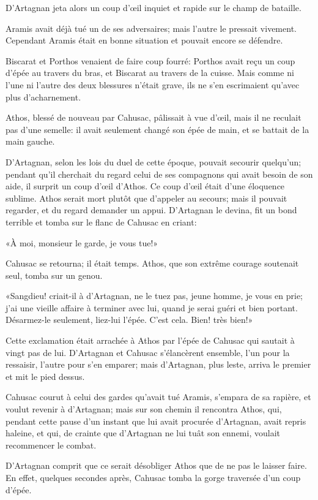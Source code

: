 D'Artagnan jeta alors un coup d'œil inquiet et rapide sur le champ de bataille. 

Aramis avait déjà tué un de ses adversaires; mais l'autre le pressait vivement. Cependant Aramis était en bonne situation et pouvait encore se défendre. 

Biscarat et Porthos venaient de faire coup fourré: Porthos avait reçu un coup d'épée au travers du bras, et Biscarat au travers de la cuisse. Mais comme ni l'une ni l'autre des deux blessures n'était grave, ils ne s'en escrimaient qu'avec plus d'acharnement. 

Athos, blessé de nouveau par Cahusac, pâlissait à vue d'œil, mais il ne reculait pas d'une semelle: il avait seulement changé son épée de main, et se battait de la main gauche. 

D'Artagnan, selon les lois du duel de cette époque, pouvait secourir quelqu'un; pendant qu'il cherchait du regard celui de ses compagnons qui avait besoin de son aide, il surprit un coup d'œil d'Athos. Ce coup d'œil était d'une éloquence sublime. Athos serait mort plutôt que d'appeler au secours; mais il pouvait regarder, et du regard demander un appui. D'Artagnan le devina, fit un bond terrible et tomba sur le flanc de Cahusac en criant: 

«À moi, monsieur le garde, je vous tue!» 

Cahusac se retourna; il était temps. Athos, que son extrême courage soutenait seul, tomba sur un genou. 

«Sangdieu! criait-il à d'Artagnan, ne le tuez pas, jeune homme, je vous en prie; j'ai une vieille affaire à terminer avec lui, quand je serai guéri et bien portant. Désarmez-le seulement, liez-lui l'épée. C'est cela. Bien! très bien!» 

Cette exclamation était arrachée à Athos par l'épée de Cahusac qui sautait à vingt pas de lui. D'Artagnan et Cahusac s'élancèrent ensemble, l'un pour la ressaisir, l'autre pour s'en emparer; mais d'Artagnan, plus leste, arriva le premier et mit le pied dessus. 

Cahusac courut à celui des gardes qu'avait tué Aramis, s'empara de sa rapière, et voulut revenir à d'Artagnan; mais sur son chemin il rencontra Athos, qui, pendant cette pause d'un instant que lui avait procurée d'Artagnan, avait repris haleine, et qui, de crainte que d'Artagnan ne lui tuât son ennemi, voulait recommencer le combat. 

D'Artagnan comprit que ce serait désobliger Athos que de ne pas le laisser faire. En effet, quelques secondes après, Cahusac tomba la gorge traversée d'un coup d'épée. 

